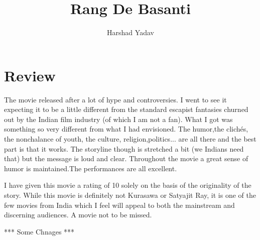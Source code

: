 \documentclass[a4paper,10pt]{article}
\title{Rang De Basanti}
\author{Harshad Yadav}
\begin{document}
\maketitle

\section{Review}
The movie released after a lot of hype and controversies. I went to see it expecting it to be a little different from the standard escapist fantasies churned out by the Indian film industry (of which I am not a fan). What I got was something so very different from what I had envisioned. The humor,the clichés, the nonchalance of youth, the culture, religion,politics... are all there and the best part is that it works. The storyline though is stretched a bit (we Indians need that) but the message is loud and clear. Throughout the movie a great sense of humor is maintained.The performances are all excellent.

I have given this movie a rating of 10 solely on the basis of the originality of the story. While this movie is definitely not Kurasawa or Satyajit Ray, it is one of the few movies from India which I feel will appeal to both the mainstream and discerning audiences. A movie not to be missed. 

*** Some Chnages ***
\end{document}
